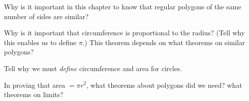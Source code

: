 \documentclass[11pt]{book}
\theoremstyle{XIplainnote}
\theoremstyle{bkplain}
\begin{document}
\begin{exlist}
\item Why is it important in this chapter to know that regular polygons of the
      same number of sides are similar?
\item Why is it important that circumference is proportional to the radius?
      (Tell why this enables us to define $\pi$.) This theorem depends on what
      theorems on similar polygons?
\item Tell why we must \emph{define} circumference and area for circles.
\item In proving that area $= \pi r^2$, what theorems about polygons did we
      need? what theorems on limits?
\end{exlist}
\end{document}

